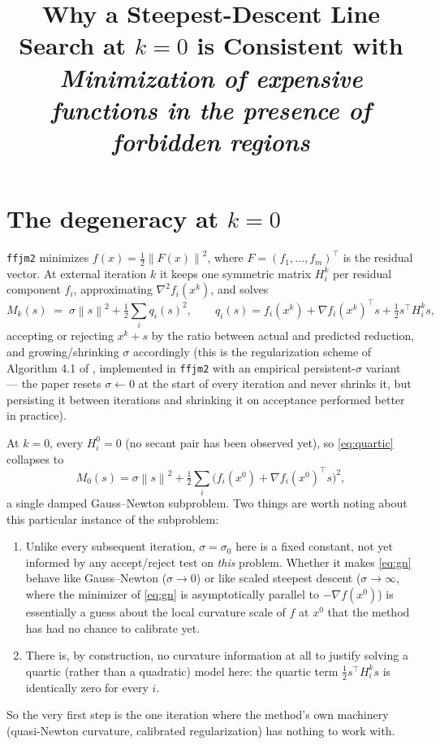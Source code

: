 \documentclass[11pt]{article}
\title{Why a Steepest-Descent Line Search at $k=0$ is Consistent with\\
\emph{Minimization of expensive functions in the presence of forbidden
regions}}
\author{}
\date{}
\newcommand{\norm}[1]{\left\lVert #1 \right\rVert}
\begin{document}
\maketitle

\section{The degeneracy at $k=0$}

\texttt{ffjm2} minimizes $f(x) = \tfrac12\norm{F(x)}^2$, where
$F=(f_1,\dots,f_m)^\top$ is the residual vector. At external iteration $k$
it keeps one symmetric matrix $H_i^k$ per residual component $f_i$,
approximating $\nabla^2 f_i(x^k)$, and solves
\begin{equation}
    M_k(s) \;=\; \sigma\norm{s}^2 + \tfrac12\sum_i q_i(s)^2, \qquad
    q_i(s) = f_i(x^k) + \nabla f_i(x^k)^\top s + \tfrac12 s^\top H_i^k s,
    \label{eq:quartic}
\end{equation}
accepting or rejecting $x^k+s$ by the ratio between actual and predicted
reduction, and growing/shrinking $\sigma$ accordingly (this is the
regularization scheme of Algorithm 4.1 of \cite{FortunatoMartinez2026},
implemented in \texttt{ffjm2} with an empirical persistent-$\sigma$
variant --- the paper resets $\sigma\leftarrow0$ at the start of every
iteration and never shrinks it, but persisting it between iterations and
shrinking it on acceptance performed better in practice).

At $k=0$, every $H_i^0=0$ (no secant pair has been observed yet), so
\eqref{eq:quartic} collapses to
\begin{equation}
    M_0(s) = \sigma\norm{s}^2 + \tfrac12\sum_i \bigl(f_i(x^0) + \nabla f_i(x^0)^\top s\bigr)^2,
    \label{eq:gn}
\end{equation}
a single damped Gauss--Newton subproblem. Two things are worth noting
about this particular instance of the subproblem:
\begin{enumerate}
    \item Unlike every subsequent iteration, $\sigma=\sigma_0$ here is a
    fixed constant, not yet informed by any accept/reject test on
    \emph{this} problem. Whether it makes \eqref{eq:gn} behave like
    Gauss--Newton ($\sigma\to0$) or like scaled steepest descent
    ($\sigma\to\infty$, where the minimizer of \eqref{eq:gn} is
    asymptotically parallel to $-\nabla f(x^0)$) is essentially a guess
    about the local curvature scale of $f$ at $x^0$ that the method has
    had no chance to calibrate yet.
    \item There is, by construction, no curvature information at all to
    justify solving a quartic (rather than a quadratic) model here: the
    quartic term $\tfrac12 s^\top H_i^k s$ is identically zero for every
    $i$.
\end{enumerate}
So the very first step is the one iteration where the method's own
machinery (quasi-Newton curvature, calibrated regularization) has nothing
to work with.
\end{document}
